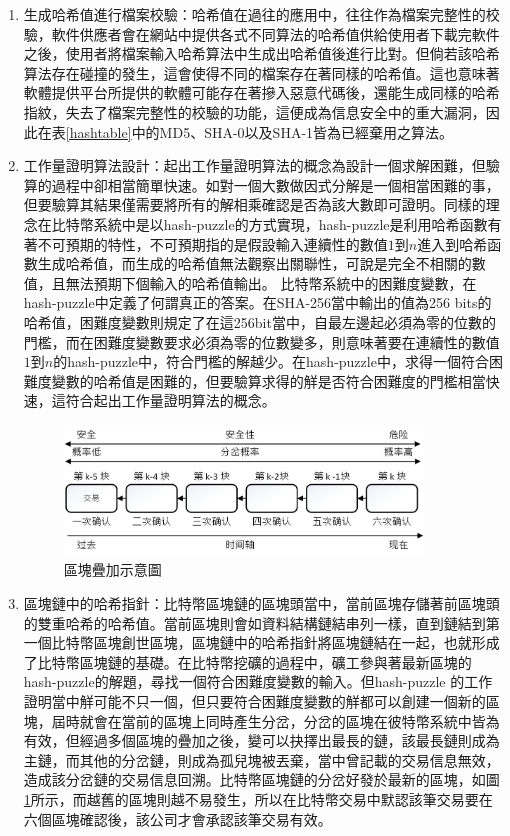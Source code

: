 				\begin{enumerate}
				\item 生成哈希值進行檔案校驗：哈希值在過往的應用中，往往作為檔案完整性的校驗，軟件供應者會在網站中提供各式不同算法的哈希值供給使用者下載完軟件之後，使用者將檔案輸入哈希算法中生成出哈希值後進行比對。但倘若該哈希算法存在碰撞的發生，這會使得不同的檔案存在著同樣的哈希值。這也意味著軟體提供平台所提供的軟體可能存在著摻入惡意代碼後，還能生成同樣的哈希指紋，失去了檔案完整性的校驗的功能，這便成為信息安全中的重大漏洞，因此在表\ref{hashtable}中的MD5、SHA-0以及SHA-1皆為已經棄用之算法。
				\item 工作量證明算法設計：起出工作量證明算法的概念為設計一個求解困難，但驗算的過程中卻相當簡單快速。如對一個大數做因式分解是一個相當困難的事，但要驗算其結果僅需要將所有的解相乘確認是否為該大數即可證明。同樣的理念在比特幣系統中是以hash-puzzle的方式實現，hash-puzzle是利用哈希函數有著不可預期的特性，不可預期指的是假設輸入連續性的數值$1$到$n$進入到哈希函數生成哈希值，而生成的哈希值無法觀察出關聯性，可說是完全不相關的數值，且無法預期下個輸入的哈希值輸出。
				比特幣系統中的困難度變數，在hash-puzzle中定義了何謂真正的答案。在SHA-256當中輸出的值為256 bits的哈希值，困難度變數則規定了在這256bit當中，自最左邊起必須為零的位數的門檻，而在困難度變數要求必須為零的位數變多，則意味著要在連續性的數值$1$到$n$的hash-puzzle中，符合門檻的解越少。在hash-puzzle中，求得一個符合困難度變數的哈希值是困難的，但要驗算求得的觧是否符合困難度的門檻相當快速，這符合起出工作量證明算法的概念。

				\begin{figure}[htbp]
					\centering
					\includegraphics[width = 0.9\textwidth]{6confirm.jpg}
					\caption{區塊疊加示意圖}\label{6confirm}
				\end{figure}

				\item 區塊鏈中的哈希指針：比特幣區塊鏈的區塊頭當中，當前區塊存儲著前區塊頭的雙重哈希的哈希值。當前區塊則會如資料結構鏈結串列一樣，直到鏈結到第一個比特幣區塊創世區塊，區塊鏈中的哈希指針將區塊鏈結在一起，也就形成了比特幣區塊鏈的基礎。在比特幣挖礦的過程中，礦工參與著最新區塊的hash-puzzle的解題，尋找一個符合困難度變數的輸入。但hash-puzzle 的工作證明當中觧可能不只一個，但只要符合困難度變數的觧都可以創建一個新的區塊，屆時就會在當前的區塊上同時產生分岔，分岔的區塊在彼特幣系統中皆為有效，但經過多個區塊的疊加之後，變可以抉擇出最長的鏈，該最長鏈則成為主鏈，而其他的分岔鏈，則成為孤兒塊被丟棄，當中曾記載的交易信息無效，造成該分岔鏈的交易信息回溯。比特幣區塊鏈的分岔好發於最新的區塊，如圖\ref{6confirm}所示，而越舊的區塊則越不易發生，所以在比特幣交易中默認該筆交易要在六個區塊確認後，該公司才會承認該筆交易有效。

				\end{enumerate}

